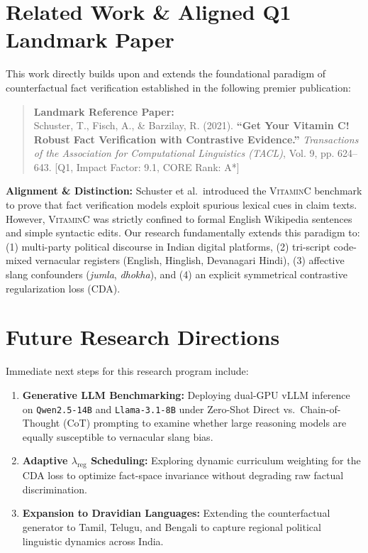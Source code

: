 \documentclass[11pt,a4paper]{article}
\begin{document}
\section{Related Work \& Aligned Q1 Landmark Paper}
This work directly builds upon and extends the foundational paradigm of counterfactual fact verification established in the following premier publication:
\begin{quote}
\textbf{Landmark Reference Paper:}\\
Schuster, T., Fisch, A., \& Barzilay, R. (2021). \textbf{``Get Your Vitamin C! Robust Fact Verification with Contrastive Evidence.''} \textit{Transactions of the Association for Computational Linguistics (TACL)}, Vol. 9, pp. 624--643. [Q1, Impact Factor: 9.1, CORE Rank: A*]
\end{quote}
\textbf{Alignment \& Distinction:} Schuster et al.\ introduced the \textsc{VitaminC} benchmark to prove that fact verification models exploit spurious lexical cues in claim texts. However, \textsc{VitaminC} was strictly confined to formal English Wikipedia sentences and simple syntactic edits. Our research fundamentally extends this paradigm to: (1) multi-party political discourse in Indian digital platforms, (2) tri-script code-mixed vernacular registers (English, Hinglish, Devanagari Hindi), (3) affective slang confounders (\textit{jumla}, \textit{dhokha}), and (4) an explicit symmetrical contrastive regularization loss (CDA).

\section{Future Research Directions}
Immediate next steps for this research program include:
\begin{enumerate}[leftmargin=*]
    \item \textbf{Generative LLM Benchmarking:} Deploying dual-GPU vLLM inference on \texttt{Qwen2.5-14B} and \texttt{Llama-3.1-8B} under Zero-Shot Direct vs.\ Chain-of-Thought (CoT) prompting to examine whether large reasoning models are equally susceptible to vernacular slang bias.
    \item \textbf{Adaptive $\lambda_{\text{reg}}$ Scheduling:} Exploring dynamic curriculum weighting for the CDA loss to optimize fact-space invariance without degrading raw factual discrimination.
    \item \textbf{Expansion to Dravidian Languages:} Extending the counterfactual generator to Tamil, Telugu, and Bengali to capture regional political linguistic dynamics across India.
\end{enumerate}
\end{document}
